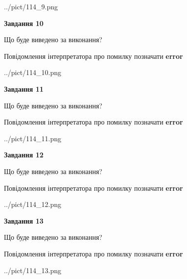 \documentclass[11pt, ukrainian]{article}
\begin{document}
{\begin {large}
\begin{center}
	{../pict/114_9.png}
\end{center}
\newpage

{\begin {center}\textbf{Завдання 10}\end {center}}\par
Що буде виведено за виконання? \par
Повідомлення інтерпретатора про помилку позначати \textbf{error}

\begin{center}
	{../pict/114_10.png}
\end{center}
\newpage

{\begin {center}\textbf{Завдання 11}\end {center}}\par
Що буде виведено за виконання? \par
Повідомлення інтерпретатора про помилку позначати \textbf{error}

\begin{center}
	{../pict/114_11.png}
\end{center}
\newpage

{\begin {center}\textbf{Завдання 12}\end {center}}\par
Що буде виведено за виконання? \par
Повідомлення інтерпретатора про помилку позначати \textbf{error}

\begin{center}
	{../pict/114_12.png}
\end{center}
\newpage

{\begin {center}\textbf{Завдання 13}\end {center}}\par
Що буде виведено за виконання? \par
Повідомлення інтерпретатора про помилку позначати \textbf{error}

\begin{center}
	{../pict/114_13.png}
\end{center}
\newpage


\end{large}}
\end{document}
